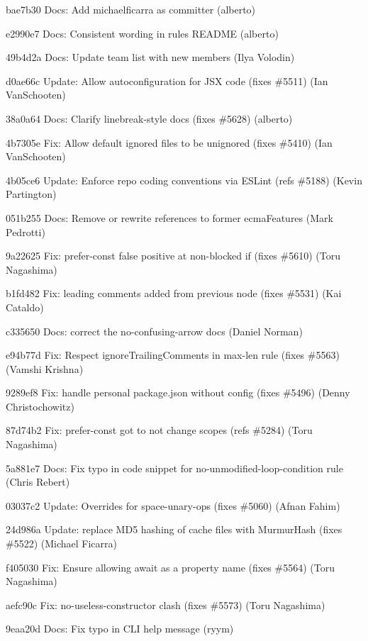 \begin{DoxyItemize}
\item bae7b30 Docs\+: Add michaelficarra as committer (alberto)
\item e2990e7 Docs\+: Consistent wording in rules R\+E\+A\+D\+ME (alberto)
\item 49b4d2a Docs\+: Update team list with new members (Ilya Volodin)
\item d0ae66c Update\+: Allow autoconfiguration for J\+SX code (fixes \#5511) (Ian Van\+Schooten)
\item 38a0a64 Docs\+: Clarify {\ttfamily linebreak-\/style} docs (fixes \#5628) (alberto)
\item 4b7305e Fix\+: Allow default ignored files to be unignored (fixes \#5410) (Ian Van\+Schooten)
\item 4b05ce6 Update\+: Enforce repo coding conventions via E\+S\+Lint (refs \#5188) (Kevin Partington)
\item 051b255 Docs\+: Remove or rewrite references to former ecma\+Features (Mark Pedrotti)
\item 9a22625 Fix\+: {\ttfamily prefer-\/const} false positive at non-\/blocked if (fixes \#5610) (Toru Nagashima)
\item b1fd482 Fix\+: leading comments added from previous node (fixes \#5531) (Kai Cataldo)
\item c335650 Docs\+: correct the no-\/confusing-\/arrow docs (Daniel Norman)
\item e94b77d Fix\+: Respect \textquotesingle{}ignore\+Trailing\+Comments\textquotesingle{} in max-\/len rule (fixes \#5563) (Vamshi Krishna)
\item 9289ef8 Fix\+: handle personal package.\+json without config (fixes \#5496) (Denny Christochowitz)
\item 87d74b2 Fix\+: {\ttfamily prefer-\/const} got to not change scopes (refs \#5284) (Toru Nagashima)
\item 5a881e7 Docs\+: Fix typo in code snippet for no-\/unmodified-\/loop-\/condition rule (Chris Rebert)
\item 03037c2 Update\+: Overrides for space-\/unary-\/ops (fixes \#5060) (Afnan Fahim)
\item 24d986a Update\+: replace M\+D5 hashing of cache files with Murmur\+Hash (fixes \#5522) (Michael Ficarra)
\item f405030 Fix\+: Ensure allowing {\ttfamily await} as a property name (fixes \#5564) (Toru Nagashima)
\item aefc90c Fix\+: {\ttfamily no-\/useless-\/constructor} clash (fixes \#5573) (Toru Nagashima)
\item 9eaa20d Docs\+: Fix typo in C\+LI help message (ryym)

\end{DoxyItemize}
